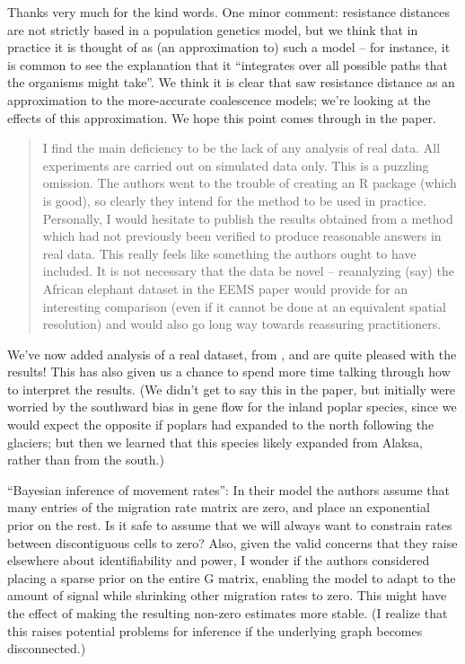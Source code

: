 Thanks very much for the kind words.
One minor comment: resistance distances are not strictly based in a population genetics model,
but we think that in practice it is thought of as (an approximation to) such a model
-- for instance, it is common to see the explanation that it
``integrates over all possible paths that the organisms might take''.
We think it is clear that \citet{mcrae2006isolation} saw resistance distance as an approximation
to the more-accurate coalescence models; we're looking at the effects of this approximation.
We hope this point comes through in the paper.


\begin{quote}
    I find the main deficiency to be the lack of any analysis of real data. All
    experiments are carried out on simulated data only. This is a puzzling omission.
    The authors went to the trouble of creating an R package (which is good), so
    clearly they intend for the method to be used in practice. Personally, I would
    hesitate to publish the results obtained from a method which had not previously
    been verified to produce reasonable answers in real data. This really feels like
    something the authors ought to have included. It is not necessary that the data
    be novel -- reanalyzing (say) the African elephant dataset in the EEMS paper
    would provide for an interesting comparison (even if it cannot be done at an
    equivalent spatial resolution) and would also go long way towards reassuring
    practitioners.
\end{quote}

We've now added analysis of a real dataset, from \citet{geraldes2014landscape},
and are quite pleased with the results!
This has also given us a chance to spend more time talking through how to interpret the results.
(We didn't get to say this in the paper,
but initially were worried by the southward bias in gene flow for the inland poplar species,
since we would expect the opposite if poplars had expanded to the north following the glaciers;
but then we learned that this species likely expanded from Alaksa, rather than from the south.)


\begin{point}{}
    ``Bayesian inference of movement rates'': In their model the authors assume
    that many entries of the migration rate matrix are zero, and place an
    exponential prior on the rest. Is it safe to assume that we will always
    want to constrain rates between discontiguous cells to zero? Also, given
    the valid concerns that they raise elsewhere about identifiability and
    power, I wonder if the authors considered placing a sparse prior on the
    entire G matrix, enabling the model to adapt to the amount of signal while
    shrinking other migration rates to zero. This might have the effect of
    making the resulting non-zero estimates more stable. (I realize that this
    raises potential problems for inference if the underlying graph becomes
    disconnected.)
\end{point}

